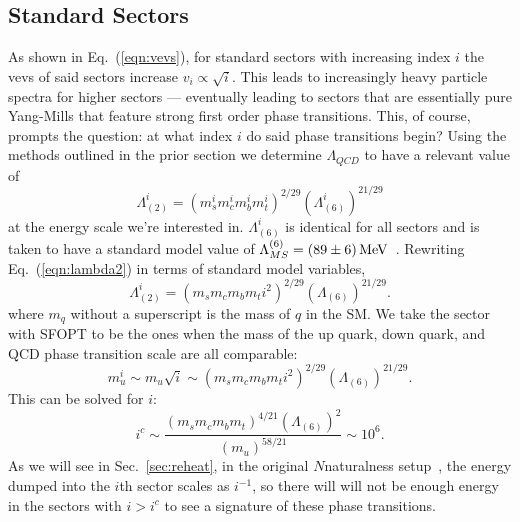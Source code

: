 \documentclass[nofootinbib,twocolumn,preprintnumbers]{revtex4-1}
\begin{document}
\subsection{Standard Sectors}
As shown in Eq.~(\ref{eqn:vevs}), for standard sectors with increasing index $i$ the vevs of said sectors increase $v_i\propto \sqrt{i}$. This leads to increasingly heavy particle spectra for higher sectors --- eventually leading to sectors that are essentially pure Yang-Mills that feature strong first order phase transitions. This, of course, prompts the question: at what index $i$ do said phase transitions begin?
Using the methods outlined in the prior section we determine $\Lambda_{QCD}$ to have a relevant value of 
\begin{equation}\label{eqn:lambda2}
\Lambda^i_{(2)} = (m_s^i m_c^i m_b^i m_t^i)^{2/29}(\Lambda^i_{(6)})^{21/29}
\end{equation} 
at the energy scale we're interested in. $\Lambda^i_{(6)}$ is identical for all sectors and is taken to have a standard model value of $\Lambda^{(6)}_{MS} =(89 \pm 6)\, {\rm MeV}$~\cite{PhysRevD.98.030001}. Rewriting Eq.~(\ref{eqn:lambda2}) in terms of standard model variables, 
\begin{equation}\label{eqn:lambda2adj}
\Lambda^i_{(2)} = (m_s m_c m_b m_t i^2)^{2/29}(\Lambda_{(6)})^{21/29}.
\end{equation}
where $m_q$ without a superscript is the mass of $q$ in the SM. We take the sector with SFOPT to be the ones when the mass of the up quark, down quark, and QCD phase transition scale are all comparable:
\begin{equation}
m^i_u \sim m_u \sqrt{i} \sim (m_s m_c m_b m_t i^2)^{2/29}(\Lambda_{(6)})^{21/29}.
\end{equation}
This can be solved for $i$:
\begin{equation}\label{eqn:critIndex}
i^c \sim \frac{(m_s m_c m_b m_t)^{4/21}(\Lambda_{(6)})^{2}}{( m_u)^{58/21}} \sim 10^6.
\end{equation}
As we will see in Sec.~\ref{sec:reheat}, in the original $N$naturalness setup~\cite{Arkani-Hamed:2016rle}, the energy dumped into the $i$th sector scales as $i^{-1}$, so there will will not be enough energy in the sectors with $i>i^c$ to see a signature of these phase transitions. 
\end{document}
